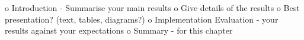 o   Introduction - Summarise your main results
o   Give details of the results
o   Best presentation? (text, tables, diagrams?)
o   Implementation Evaluation - your results against your expectations
o   Summary - for this chapter